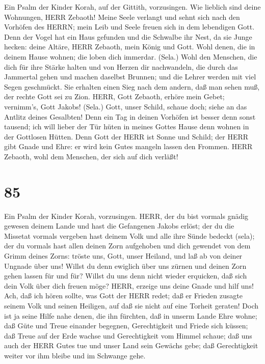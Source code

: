  Ein Psalm der Kinder Korah, auf der Gittith, vorzusingen.
Wie lieblich sind deine Wohnungen, HERR Zebaoth!  Meine
Seele verlangt und sehnt sich nach den Vorhöfen des HERRN; mein Leib und
Seele freuen sich in dem lebendigen Gott.  Denn der Vogel
hat ein Haus gefunden und die Schwalbe ihr Nest, da sie Junge hecken:
deine Altäre, HERR Zebaoth, mein König und Gott.  Wohl
denen, die in deinem Hause wohnen; die loben dich immerdar. (Sela.)
 Wohl den Menschen, die dich für ihre Stärke halten und von
Herzen dir nachwandeln,  die durch das Jammertal gehen und
machen daselbst Brunnen; und die Lehrer werden mit viel Segen
geschmückt.  Sie erhalten einen Sieg nach dem andern, daß
man sehen muß, der rechte Gott sei zu Zion.  HERR, Gott
Zebaoth, erhöre mein Gebet; vernimm's, Gott Jakobs! (Sela.) 
Gott, unser Schild, schaue doch; siehe an das Antlitz deines Gesalbten!
 Denn ein Tag in deinen Vorhöfen ist besser denn sonst
tausend; ich will lieber der Tür hüten in meines Gottes Hause denn
wohnen in der Gottlosen Hütten.  Denn Gott der HERR ist
Sonne und Schild; der HERR gibt Gnade und Ehre: er wird kein Gutes
mangeln lassen den Frommen.  HERR Zebaoth, wohl dem
Menschen, der sich auf dich verläßt!

\hypertarget{section-84}{%
\section{85}\label{section-84}}

 Ein Psalm der Kinder Korah, vorzusingen. HERR, der du bist
vormals gnädig gewesen deinem Lande und hast die Gefangenen Jakobs
erlöst;  der du die Missetat vormals vergeben hast deinem
Volk und alle ihre Sünde bedeckt (sela);  der du vormals
hast allen deinen Zorn aufgehoben und dich gewendet von dem Grimm deines
Zorns:  tröste uns, Gott, unser Heiland, und laß ab von
deiner Ungnade über uns!  Willst du denn ewiglich über uns
zürnen und deinen Zorn gehen lassen für und für?  Willst du
uns denn nicht wieder erquicken, daß sich dein Volk über dich freuen
möge?  HERR, erzeige uns deine Gnade und hilf uns!
 Ach, daß ich hören sollte, was Gott der HERR redet; daß er
Frieden zusagte seinem Volk und seinen Heiligen, auf daß sie nicht auf
eine Torheit geraten!  Doch ist ja seine Hilfe nahe denen,
die ihn fürchten, daß in unserm Lande Ehre wohne;  daß Güte
und Treue einander begegnen, Gerechtigkeit und Friede sich küssen;
 daß Treue auf der Erde wachse und Gerechtigkeit vom Himmel
schaue;  daß uns auch der HERR Gutes tue und unser Land
sein Gewächs gebe;  daß Gerechtigkeit weiter vor ihm bleibe
und im Schwange gehe.

